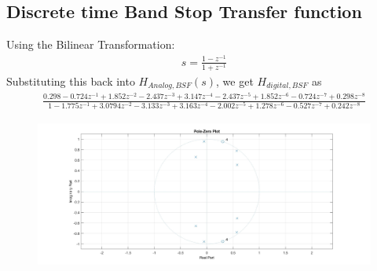 \documentclass[12pt]{article}
\begin{document}
	\subsection{Discrete time Band Stop Transfer function}
	\color{black}
	Using the Bilinear Transformation:
	\begin{gather*}
		s = \frac{1-z^{-1}}{1+z^{-1}}
	\end{gather*}
	Substituting this back into $H_{Analog,BSF}(s)$, we get $H_{digital,BSF}$ as
	\begin{gather*}
		\frac{0.298 - 0.724z^{-1} + 1.852z^{-2} - 2.437z^{-3} + 3.147z^{-4} - 2.437z^{-5} + 1.852z^{-6} - 0.724z^{-7}	+ 0.298z^{-8}}{1 - 1.775z^{-1} + 3.0794z^{-2} - 3.133z^{-3} + 3.163z^{-4} - 2.002z^{-5} + 1.278z^{-6} - 0.527z^{-7} + 0.242z^{-8}}
	\end{gather*}
	\begin{figure}[H]
		\centering
		\includegraphics[width = 18cm]{Filter2PZ.jpg}
	\end{figure}
	
\end{document}
